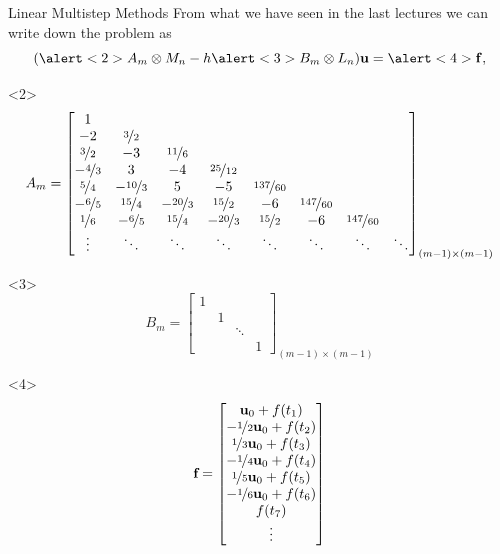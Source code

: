 \documentclass[aspectratio=169,xcolor=dvipsnames]{beamer}
\begin{document}
	\begin{frame}{Linear Multistep Methods}
	From what we have seen in the last lectures we can write down the problem as
	\[
	(\alert<2>{A_m} \otimes M_n - h \alert<3>{B_m} \otimes L_n) \mathbf{u} = \alert<4>{\mathbf{f}},
	\]
	\begin{onlyenv}
	\[
	A_m = \begin{bmatrix}
	1 & \\
	-2 & \nicefrac{3}{2} \\
	\nicefrac{3}{2} & -3 & \nicefrac{11}{6} \\
	 -\nicefrac{4}{3} & 3 & -4 & \nicefrac{25}{12} \\
	 \nicefrac{5}{4} & -\nicefrac{10}{3} & 5 & -5 & \nicefrac{137}{60} \\
	-\nicefrac{6}{5} & \nicefrac{15}{4} & -\nicefrac{20}{3} & \nicefrac{15}{2} & -6 & \nicefrac{147}{60} \\
	\nicefrac{1}{6} & -\nicefrac{6}{5} & \nicefrac{15}{4} & -\nicefrac{20}{3} & \nicefrac{15}{2} & -6 & \nicefrac{147}{60} \\
	\vdots & \ddots & \ddots & \ddots & \ddots & \ddots & \ddots & \ddots \\
	\end{bmatrix}_{(m-1) \times (m-1)}
	\]
	\end{onlyenv}
	\begin{onlyenv}
	\[
	B_m = \begin{bmatrix}
	1 & \\
	& 1 \\
	& & \ddots \\
	& & & 1
	\end{bmatrix}_{(m-1) \times (m-1)}
	\]
	\end{onlyenv}
	\begin{onlyenv}
	\[
	\textbf{f} = \begin{bmatrix}
	\mathbf{u}_0 + f(t_{1})\\
	-\nicefrac{1}{2} \mathbf{u}_0 + f(t_{2})\\
	\nicefrac{1}{3} \mathbf{u}_0 + f(t_{3})\\
	-\nicefrac{1}{4} \mathbf{u}_0 + f(t_{4})\\
	\nicefrac{1}{5} \mathbf{u}_0 + f(t_{5})\\
	-\nicefrac{1}{6} \mathbf{u}_0 + f(t_{6})\\
	f(t_{7}) \\
	\vdots
	\end{bmatrix}
	\]
	\end{onlyenv}
	\end{frame}
\end{document}
